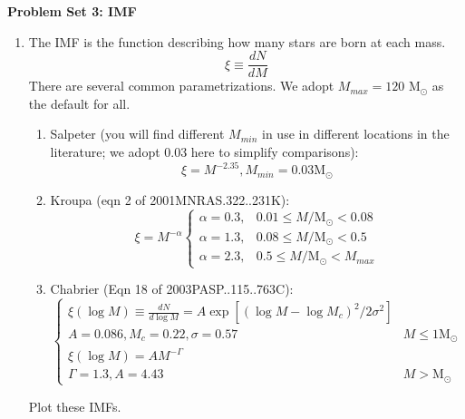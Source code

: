 \documentclass[twoside]{tufte-book} %
\newcommand{\msun}{\ensuremath{\mathrm{M}_\odot}\xspace}
\begin{document}
\noindent\textbf{Problem Set 3: IMF}

\begin{enumerate}
    \item The IMF is the function describing how many stars are born at each mass.
        \begin{equation}
            \xi \equiv \frac{dN}{dM}
        \end{equation}
        There are several common parametrizations.  We adopt $M_{max} = 120$ \msun
        as the default for all.
        \begin{enumerate}
            \item Salpeter (you will find different $M_{min}$ in use in
                different locations in the literature; we adopt 0.03 here
                to simplify comparisons):
            \begin{equation}
                \xi = M^{-2.35}, M_{min}=0.03 \msun
            \end{equation}

            \item Kroupa (eqn 2 of 2001MNRAS.322..231K):\\
            $$ \xi = M^{-\alpha}
            \begin{cases}
                  \alpha=0.3, & 0.01 \leq M/\msun < 0.08 \\
                  \alpha=1.3, & 0.08 \leq M/\msun < 0.5 \\
                  \alpha=2.3, & 0.5 \leq M/\msun < M_{max}
            \end{cases}
            $$

            \item Chabrier (Eqn 18 of 2003PASP..115..763C):\\
                $$
            \begin{cases}
                \xi(\log M) \equiv \frac{dN}{d\log M} = A \exp\left[(\log M - \log M_c)^2/2\sigma^2\right]  \\
                A = 0.086, M_c = 0.22, \sigma=0.57 &  M\leq1 \msun\\
                \xi(\log M) = A M^{-\Gamma}   \\
                \Gamma = 1.3, A = 4.43 & M>\msun
            \end{cases}
            $$
    

        \end{enumerate}
    Plot these IMFs.


\end{enumerate}
\end{document}
